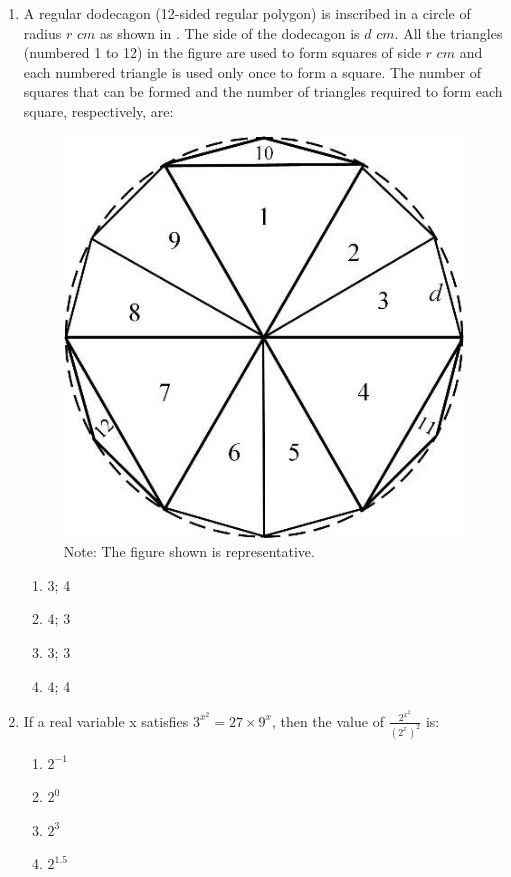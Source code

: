 \documentclass[journal]{IEEEtran}
\begin{document}
\begin{enumerate}
\item A regular dodecagon (12-sided regular polygon) is inscribed in a circle of radius $r$ $cm$ as shown in . The side of the dodecagon is $d$ $cm$. All the triangles (numbered 1 to 12) in the figure are used to form squares of side $r$ $cm$ and each numbered triangle is used only once to form a square. The number of squares that can be formed and the number of triangles required to form each square, respectively, are:
\hfill{}
\begin{figure}[H]
    \centering
    \includegraphics[width=0.4\columnwidth]{figs/fig2.jpg}
    \caption{Note: The figure shown is representative.}
    \label{fig2}
\end{figure}
\begin{enumerate}
\item 3; 4
\item 4; 3
\item 3; 3
\item 4; 4
\end{enumerate}

\item If a real variable x satisfies $3^{x^2} = 27 \times 9^x$, then the value of $\frac{2^{x^2}}{(2^x)^2}$ is:
\hfill{}
\begin{enumerate}
\item $2^{-1}$
\item $2^0$
\item $2^3$
\item $2^{1.5}$
\end{enumerate}


\end{enumerate}
\end{document}

